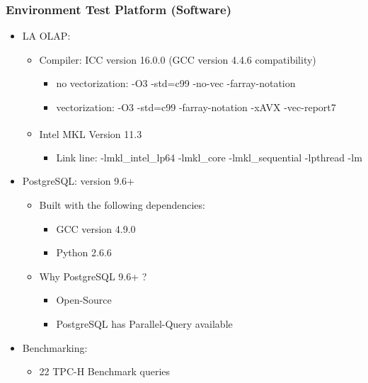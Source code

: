 \documentclass{beamer}
\begin{document}
\begin{frame}[fragile]
\frametitle{Environment Test Platform (Software)}


\begin{itemize}
\item LA OLAP: 
    \begin{itemize}

    \item Compiler: ICC version 16.0.0 (GCC version 4.4.6 compatibility)
    \begin{itemize}
        \item no vectorization: -O3 -std=c99 -no-vec -farray-notation 
        \item vectorization: -O3 -std=c99 -farray-notation -xAVX -vec-report7
    \end{itemize}
    \item Intel\textsuperscript{\textregistered} MKL Version	11.3
    \begin{itemize}
        \item Link line: -lmkl\_intel\_lp64 -lmkl\_core -lmkl\_sequential -lpthread -lm
    \end{itemize}
        \end{itemize}

\vspace{0.35cm}
    \item PostgreSQL: version 9.6+ 
    \begin{itemize}
        \item Built with the following dependencies:
        \begin{itemize}
            \item GCC version 4.9.0
            \item Python 2.6.6
        \end{itemize}
        \item Why PostgreSQL 9.6+ ?
        \begin{itemize}
            \item Open-Source
            \item PostgreSQL has Parallel-Query available\footnotemark[1]
        \end{itemize}
    \end{itemize}
    \vspace{0.35cm}
    \item Benchmarking: 
    \begin{itemize}
        \item 22 TPC-H Benchmark  queries
        \end{itemize}
\end{itemize}

\tiny
{}

\end{frame}
\end{document}
